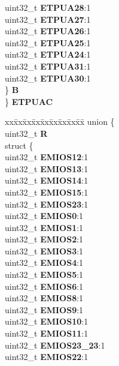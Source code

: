 \begin{DoxyCompactItemize}
\begin{tabbing}
\>\>uint32\_t {\bfseries ETPUA28}:1\\
\>\>uint32\_t {\bfseries ETPUA27}:1\\
\>\>uint32\_t {\bfseries ETPUA26}:1\\
\>\>uint32\_t {\bfseries ETPUA25}:1\\
\>\>uint32\_t {\bfseries ETPUA24}:1\\
\>\>uint32\_t {\bfseries ETPUA31}:1\\
\>\>uint32\_t {\bfseries ETPUA30}:1\\
\>\} {\bfseries B}\\
\} {\bfseries ETPUAC}\\

\end{tabbing}\item 
\mbox{\label{structSIU__tag_a7743bf6f9a950083e2fb28f2bcb1261b}} 
\begin{tabbing}
xx\=xx\=xx\=xx\=xx\=xx\=xx\=xx\=xx\=\kill
union \{\\
\>uint32\_t {\bfseries R}\\
\>struct \{\\
\>\>uint32\_t {\bfseries EMIOS12}:1\\
\>\>uint32\_t {\bfseries EMIOS13}:1\\
\>\>uint32\_t {\bfseries EMIOS14}:1\\
\>\>uint32\_t {\bfseries EMIOS15}:1\\
\>\>uint32\_t {\bfseries EMIOS23}:1\\
\>\>uint32\_t {\bfseries EMIOS0}:1\\
\>\>uint32\_t {\bfseries EMIOS1}:1\\
\>\>uint32\_t {\bfseries EMIOS2}:1\\
\>\>uint32\_t {\bfseries EMIOS3}:1\\
\>\>uint32\_t {\bfseries EMIOS4}:1\\
\>\>uint32\_t {\bfseries EMIOS5}:1\\
\>\>uint32\_t {\bfseries EMIOS6}:1\\
\>\>uint32\_t {\bfseries EMIOS8}:1\\
\>\>uint32\_t {\bfseries EMIOS9}:1\\
\>\>uint32\_t {\bfseries EMIOS10}:1\\
\>\>uint32\_t {\bfseries EMIOS11}:1\\
\>\>uint32\_t {\bfseries EMIOS23\_23}:1\\
\>\>uint32\_t {\bfseries EMIOS22}:1\\

\end{tabbing}
\end{DoxyCompactItemize}
